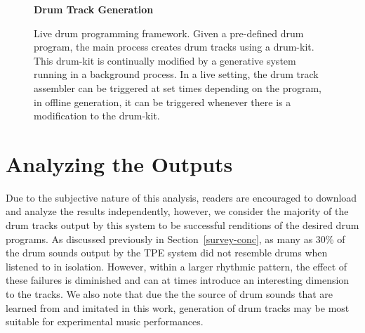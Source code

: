 \documentclass[\main/thesis.tex]{subfiles}
\begin{document}
\begin{figure}[tpb]
    \begin{center}
    \textbf{Drum Track Generation}
    \end{center}
    \caption{Live drum programming framework. Given a pre-defined drum program, the main process creates drum tracks using a drum-kit. This drum-kit is continually modified by a generative system running in a background process. In a live setting, the drum track assembler can be triggered at set times depending on the program, in offline generation, it can be triggered whenever there is a modification to the drum-kit.  }
\label{fig:live_drumming}
\end{figure} 

\section{Analyzing the Outputs}
 Due to the subjective nature of this analysis, readers are encouraged to download and analyze the results independently, however, we consider the majority of the drum tracks output by this system to be successful renditions of the desired drum programs. As discussed previously in Section~\ref{survey-conc}, as many as 30\% of the drum sounds output by the TPE system did not resemble drums when listened to in isolation. However, within a larger rhythmic pattern, the effect of these failures is diminished and can at times introduce an interesting dimension to the tracks. We also note that due the the source of drum sounds that are learned from and imitated in this work, generation of drum tracks may be most suitable for experimental music performances.
 
\end{document}
